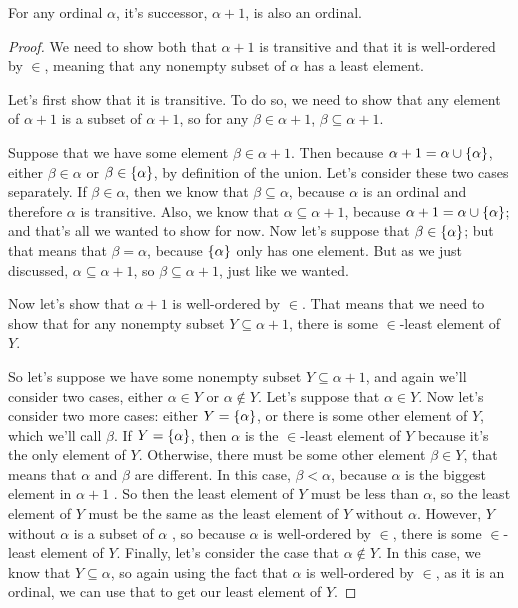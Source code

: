 \begin{lemma}
    For any ordinal $\alpha$, it's successor, $\alpha + 1$, is also an ordinal.
\end{lemma}
\begin{proof}
    We need to show both that $\alpha + 1$ is transitive and that it is well-ordered by $\in$, meaning that any nonempty subset of $\alpha$ has a least element.

    Let's first show that it is transitive.
    To do so, we need to show that any element of $\alpha + 1$ is a subset of $\alpha + 1$, so for any $\beta \in \alpha + 1$, $\beta \subseteq \alpha + 1$.

    Suppose that we have some element $\beta \in \alpha + 1$.
    Then because $\alpha + 1 = \alpha \cup {\left\{ {\alpha} \right\}}$, either $\beta \in \alpha$ or $\beta \in {\left\{ {\alpha} \right\}}$, by definition of the union.
    Let's consider these two cases separately.
    If $\beta \in \alpha$, then we know that $\beta \subseteq \alpha$, because $\alpha$ is an ordinal and therefore $\alpha$ is transitive.
    Also, we know that $\alpha \subseteq \alpha + 1$, because $\alpha + 1 = \alpha \cup {\left\{ {\alpha} \right\}}$; and that's all we wanted to show for now.
    Now let's suppose that $\beta \in {\left\{ {\alpha} \right\}}$; but that means that $\beta = \alpha$, because ${\left\{ {\alpha} \right\}}$ only has one element.
    But as we just discussed, $\alpha \subseteq \alpha + 1$, so $\beta \subseteq \alpha + 1$, just like we wanted.

    Now let's show that $\alpha + 1$ is well-ordered by $\in$.
    That means that we need to show that for any nonempty subset $Y \subseteq \alpha + 1$, there is some $\in$-least element of $Y$.

    So let's suppose we have some nonempty subset $Y \subseteq \alpha + 1$, and again we'll consider two cases, either $\alpha \in Y$ or $\alpha \not\in Y$.
    Let's suppose that $\alpha \in Y$.
    Now let's consider two more cases: either $Y = {\left\{ {\alpha} \right\}}$, or there is some other element of $Y$, which we'll call $\beta$.
    If $Y = {\left\{ {\alpha} \right\}}$, then $\alpha$ is the $\in$-least element of $Y$ because it's the only element of $Y$.
    Otherwise, there must be some other element $\beta \in Y$, that means that $\alpha$ and $\beta$ are different.
    In this case, $\beta < \alpha$, because $\alpha$ is the biggest element in $\alpha + 1$ .
    So then the least element of $Y$ must be less than $\alpha$, so the least element of $Y$ must be the same as the least element of $Y$ without $\alpha$.
    However, $Y$ without $\alpha$ is a subset of $\alpha$ , so because $\alpha$ is well-ordered by $\in$, there is some $\in$-least element of $Y$.
    Finally, let's consider the case that $\alpha \not\in Y$.
    In this case, we know that $Y \subseteq \alpha$, so again using the fact that $\alpha$ is well-ordered by $\in$, as it is an ordinal, we can use that to get our least element of $Y$.


\end{proof}
